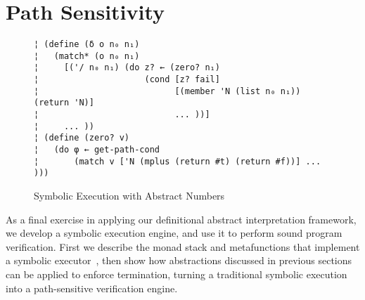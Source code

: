 \section{Path Sensitivity}\label{s:symbolic}

\begin{figure} %
\begin{lstlisting}
¦ (define (δ o n₀ n₁)
¦   (match* (o n₀ n₁)
¦     [('/ n₀ n₁) (do z? ← (zero? n₁)
¦                     (cond [z? fail]
¦                           [(member 'N (list n₀ n₁)) (return 'N)]
¦                           ... ))]
¦     ... ))
¦ (define (zero? v)
¦   (do φ ← get-path-cond
¦       (match v ['N (mplus (return #t) (return #f))] ... )))
\end{lstlisting}
\vspace{-0.75em}
\caption{Symbolic Execution with Abstract Numbers}
\label{f:symbolic-widen}
\vspace{-1em}
\end{figure} %

As a final exercise in applying our definitional abstract interpretation
framework, we develop a symbolic execution engine, and use it to perform sound
program verification. First we describe the monad stack and metafunctions that
implement a symbolic executor~\cite{dvanhorn:King1976Symbolic}, then show how
abstractions discussed in previous sections can be applied to enforce
termination, turning a traditional symbolic execution into a path-sensitive
verification engine.

